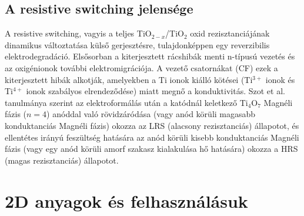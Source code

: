 \documentclass[twoside]{article}
\begin{document}
\subsection{A resistive switching jelensége}
A resistive switching, vagyis a teljes TiO$_{2-x}$/TiO$_2$ oxid rezisztanciájának dinamikus változtatása külső gerjesztésre, tulajdonképpen egy reverzibilis elektrodegradáció. Elsősorban a kiterjesztett rácshibák menti n-típusú vezetés és az oxigénionok további elektromigrációja. A vezető csatornákat (CF) ezek a kiterjesztett hibák alkotják, amelyekben a Ti ionok kiálló kötései (Ti$^{3+}$ ionok és Ti$^{4+}$ ionok szabályos elrendeződése\cite{benchchem}) miatt megnő a konduktivitás\cite{szot2014}. Szot et al. tanulmánya szerint az elektroformálás után a katódnál keletkező Ti$_4$O$_7$ Magnéli fázis ($n = 4$) anóddal való rövidzáródása (vagy anód körüli magasabb konduktanciás Magnéli fázis) okozza az LRS (alacsony rezisztanciás) állapotot, és ellentétes irányú feszültség hatására az anód körüli kisebb konduktanciás Magnéli fázis (vagy egy anód körüli amorf szakasz kialakulása hő hatására\cite{szot2011}) okozza a HRS (magas rezisztanciás) állapotot\cite{szot2014}.  
\section{2D anyagok és felhasználásuk}
\end{document}
